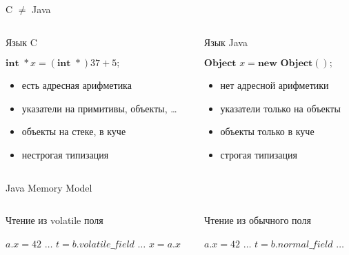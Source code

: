 \documentclass[usenames,dvipsnames,pdftex,unicode]{beamer}
\newcommand{\eng}[1]{{\English#1}}
\begin{document}
\begin{frame}{C $\neq$ Java}

  \begin{columns}[t]
    \begin{column}{5cm}
      {\Large Язык C}

      $\textbf{int } *x = (\textbf{int } *)37 + 5;$

      \begin{itemize}
        \item есть адресная арифметика
        \item указатели на примитивы, объекты, \ldots
        \item объекты на стеке, в куче
        \item нестрогая типизация
      \end{itemize}
    \end{column}
    \begin{column}{5cm}
      {\Large Язык Java}

      $\textbf{Object } x = \textbf{new Object}();$

      \begin{itemize}
        \item нет адресной арифметики
        \item указатели только на объекты
        \item объекты только в куче
        \item строгая типизация
      \end{itemize}
    \end{column}
  \end{columns}

\end{frame}

\begin{frame}{Java Memory Model}
  \begin{columns}[t]
    \begin{column}{5cm}
      \begin{block}{Чтение из \eng{volatile} поля}
        \begin{algorithmic}
          \STATE $a.x = 42$
          \STATE $\ldots$
          \STATE $t = b.volatile\_field$
          \STATE $\ldots$
          \STATE $x = a.x$
        \end{algorithmic}
      \end{block}
    \end{column}
    \begin{column}{5cm}
      \begin{block}{Чтение из обычного поля}
        \begin{algorithmic}
          \STATE $a.x = 42$
          \STATE $\ldots$
          \STATE $t = b.normal\_field$
          \STATE $\ldots$
          \STATE {}
        \end{algorithmic}
      \end{block}
    \end{column}
  \end{columns}
\end{frame}
\end{document}
